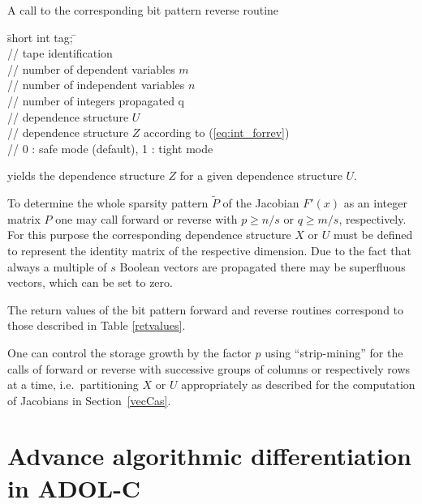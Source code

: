 \documentclass[11pt,twoside]{article}
\begin{document}
A call to the corresponding bit pattern {\sf reverse} routine
%
\begin{tabbing}
\hspace{0.5in}\={\sf short int tag;} \hspace{1.1in}\= \kill    %
\\
         \> // tape identification \\
                 \> // number of dependent variables $m$\\
                 \> // number of independent variables $n$\\
                 \> // number of integers propagated q\\
  \> // dependence structure $U$ \\
  \> // dependence structure $Z$ according
                                     to (\ref{eq:int_forrev})\\
        \> // 0 : safe mode (default), 1 : tight mode
\end{tabbing}
%
yields the dependence structure $Z$ for a given dependence structure
$U$.

To determine the whole sparsity pattern $\tilde{P}$ of the Jacobian $F'(x)$
as an integer matrix $P$ one may call {\sf forward} or {\sf reverse} 
with $p \ge n/s$ or $q \ge m/s$, respectively. For this purpose the 
corresponding dependence structure $X$ or $U$ must be defined to represent  
the identity matrix of the respective dimension.
Due to the fact that always a multiple of $s$ Boolean vectors are propagated
there may be superfluous vectors, which can be set to zero.

The return values of the bit pattern {\sf forward} and {\sf reverse} routines
correspond to those described in Table \ref{retvalues}. 

One can control the storage growth by the factor $p$ using
``strip-mining'' for the calls of {\sf forward} or {\sf reverse} with successive
groups of columns or respectively rows at a time, i.e.~partitioning 
$X$ or $U$ appropriately as described for the computation of Jacobians 
in Section~\ref{vecCas}.
%
%
\section{Advance algorithmic differentiation in ADOL-C}
\label{adv_ad}
%
\end{document}

